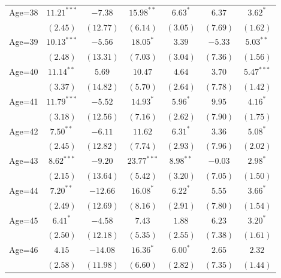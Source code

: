 \documentclass[fullpage]{paper}
\begin{document}
\begin{center}
\begin{longtable}{l c c c c c c }
Age=38      & $11.21^{***}$ & $-7.38$      & $15.98^{**}$  & $6.63^{*}$   & $6.37$        & $3.62^{*}$    \\
            & $(2.45)$      & $(12.77)$    & $(6.14)$      & $(3.05)$     & $(7.69)$      & $(1.62)$      \\
Age=39      & $10.13^{***}$ & $-5.56$      & $18.05^{*}$   & $3.39$       & $-5.33$       & $5.03^{**}$   \\
            & $(2.48)$      & $(13.31)$    & $(7.03)$      & $(3.04)$     & $(7.36)$      & $(1.56)$      \\
Age=40      & $11.14^{**}$  & $5.69$       & $10.47$       & $4.64$       & $3.70$        & $5.47^{***}$  \\
            & $(3.37)$      & $(14.82)$    & $(5.70)$      & $(2.64)$     & $(7.78)$      & $(1.42)$      \\
Age=41      & $11.79^{***}$ & $-5.52$      & $14.93^{*}$   & $5.96^{*}$   & $9.95$        & $4.16^{*}$    \\
            & $(3.18)$      & $(12.56)$    & $(7.16)$      & $(2.62)$     & $(7.90)$      & $(1.75)$      \\
Age=42      & $7.50^{**}$   & $-6.11$      & $11.62$       & $6.31^{*}$   & $3.36$        & $5.08^{*}$    \\
            & $(2.45)$      & $(12.82)$    & $(7.74)$      & $(2.93)$     & $(7.96)$      & $(2.02)$      \\
Age=43      & $8.62^{***}$  & $-9.20$      & $23.77^{***}$ & $8.98^{**}$  & $-0.03$       & $2.98^{*}$    \\
            & $(2.15)$      & $(13.64)$    & $(5.42)$      & $(3.20)$     & $(7.05)$      & $(1.50)$      \\
Age=44      & $7.20^{**}$   & $-12.66$     & $16.08^{*}$   & $6.22^{*}$   & $5.55$        & $3.66^{*}$    \\
            & $(2.49)$      & $(12.69)$    & $(8.16)$      & $(2.91)$     & $(7.80)$      & $(1.54)$      \\
Age=45      & $6.41^{*}$    & $-4.58$      & $7.43$        & $1.88$       & $6.23$        & $3.20^{*}$    \\
            & $(2.50)$      & $(12.18)$    & $(5.35)$      & $(2.55)$     & $(7.38)$      & $(1.61)$      \\
Age=46      & $4.15$        & $-14.08$     & $16.36^{*}$   & $6.00^{*}$   & $2.65$        & $2.32$        \\
            & $(2.58)$      & $(11.98)$    & $(6.60)$      & $(2.82)$     & $(7.35)$      & $(1.44)$      \\

\end{longtable}
\end{center}
\end{document}
